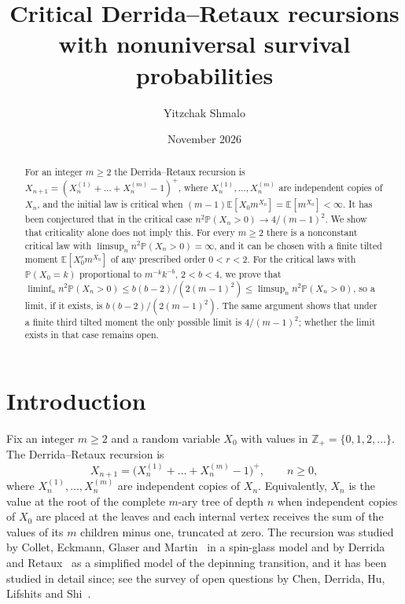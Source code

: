 \documentclass[11pt]{amsart}
\title[Critical Derrida--Retaux recursions]{Critical Derrida--Retaux recursions with nonuniversal survival probabilities}
\author{Yitzchak Shmalo}
\date{November 2026}
\theoremstyle{remark}
\numberwithin{equation}{section}
\newcommand{\PP}{\mathbb{P}}
\newcommand{\EE}{\mathbb{E}}
\begin{document}
\begin{abstract}
For an integer $m\ge2$ the Derrida--Retaux recursion is $X_{n+1}=(X_n^{(1)}+\dots+X_n^{(m)}-1)^+$, where $X_n^{(1)},\dots,X_n^{(m)}$ are independent copies of $X_n$, and the initial law is critical when $(m-1)\EE[X_0m^{X_0}]=\EE[m^{X_0}]<\infty$. It has been conjectured that in the critical case $n^2\PP(X_n>0)\to4/(m-1)^2$. We show that criticality alone does not imply this. For every $m\ge2$ there is a nonconstant critical law with $\limsup_n n^2\PP(X_n>0)=\infty$, and it can be chosen with a finite tilted moment $\EE[X_0^rm^{X_0}]$ of any prescribed order $0<r<2$. For the critical laws with $\PP(X_0=k)$ proportional to $m^{-k}k^{-b}$, $2<b<4$, we prove that $\liminf_n n^2\PP(X_n>0)\le b(b-2)/(2(m-1)^2)\le\limsup_n n^2\PP(X_n>0)$, so a limit, if it exists, is $b(b-2)/(2(m-1)^2)$. The same argument shows that under a finite third tilted moment the only possible limit is $4/(m-1)^2$; whether the limit exists in that case remains open.
\end{abstract}
\maketitle

\section{Introduction}\label{sec:intro}
Fix an integer $m\ge2$ and a random variable $X_0$ with values in $\mathbb Z_+=\{0,1,2,\dots\}$. The Derrida--Retaux recursion is
\begin{equation}\label{eq:rec}
X_{n+1}=\bigl(X_n^{(1)}+\dots+X_n^{(m)}-1\bigr)^+,\qquad n\ge0,
\end{equation}
where $X_n^{(1)},\dots,X_n^{(m)}$ are independent copies of $X_n$. Equivalently, $X_n$ is the value at the root of the complete $m$-ary tree of depth $n$ when independent copies of $X_0$ are placed at the leaves and each internal vertex receives the sum of the values of its $m$ children minus one, truncated at zero. The recursion was studied by Collet, Eckmann, Glaser and Martin~\cite{CEGM} in a spin-glass model and by Derrida and Retaux~\cite{DR} as a simplified model of the depinning transition, and it has been studied in detail since; see the survey of open questions by Chen, Derrida, Hu, Lifshits and Shi~\cite{CDHLS}.
\end{document}
